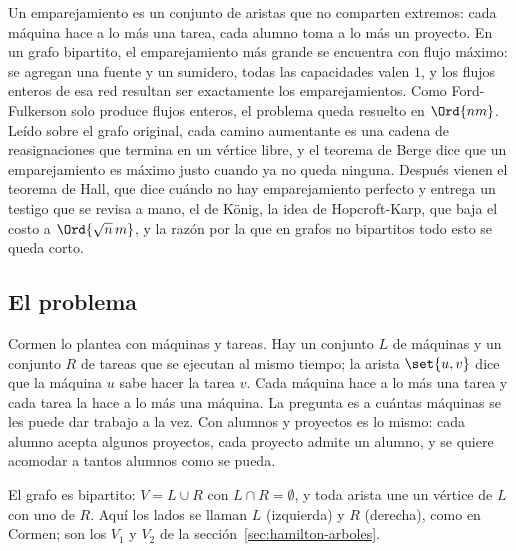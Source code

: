 \documentclass[11pt,letterpaper]{article}
\begin{document}
\newpage


\label{sec:emparejamiento}

\begin{quick_sum}
  Un emparejamiento es un conjunto de aristas que no comparten
  extremos: cada máquina hace a lo más una tarea, cada alumno toma a
  lo más un proyecto. En un grafo bipartito, el emparejamiento más
  grande se encuentra con flujo máximo: se agregan una fuente y un
  sumidero, todas las capacidades valen $1$, y los flujos enteros de
  esa red resultan ser exactamente los emparejamientos. Como
  Ford-Fulkerson solo produce flujos enteros, el problema queda
  resuelto en $\Ord{nm}$. Leído sobre el grafo original, cada camino
  aumentante es una cadena de reasignaciones que termina en un
  vértice libre, y el teorema de Berge dice que un emparejamiento es
  máximo justo cuando ya no queda ninguna. Después vienen el teorema
  de Hall, que dice cuándo no hay emparejamiento perfecto y entrega
  un testigo que se revisa a mano, el de König, la idea de
  Hopcroft-Karp, que baja el costo a $\Ord{\sqrt{n}\, m}$, y la razón
  por la que en grafos no bipartitos todo esto se queda corto.
\end{quick_sum}

\subsection*{El problema}

Cormen lo plantea con máquinas y tareas. Hay un conjunto $L$ de
máquinas y un conjunto $R$ de tareas que se ejecutan al mismo
tiempo; la arista $\set{u, v}$ dice que la máquina $u$ sabe hacer la
tarea $v$. Cada máquina hace a lo más una tarea y cada tarea la hace
a lo más una máquina. La pregunta es a cuántas máquinas se les puede
dar trabajo a la vez. Con alumnos y proyectos es lo mismo: cada
alumno acepta algunos proyectos, cada proyecto admite un alumno, y se
quiere acomodar a tantos alumnos como se pueda.

El grafo es bipartito: $V = L \cup R$ con $L \cap R = \emptyset$, y
toda arista une un vértice de $L$ con uno de $R$. Aquí los lados se
llaman $L$ (izquierda) y $R$ (derecha), como en Cormen; son los $V_1$
y $V_2$ de la sección~\ref{sec:hamilton-arboles}.
\end{document}
